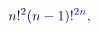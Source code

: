 \documentclass[12pt]{article}
\begin{document}
\makeatletter
\renewcommand*{\@textcolor}[3]{%
  \protect\leavevmode
  \begingroup
    \color#1{#2}#3%
  \endgroup
}
\makeatother
\begin{displaymath}
\mathcolor[RGB]{0,0,15}{n} \mathcolor[RGB]{0,0,30}{!} ^ { \mathcolor[RGB]{0,0,45}{2} } \mathcolor[RGB]{0,0,60}{(} \mathcolor[RGB]{0,0,75}{n} \mathcolor[RGB]{0,0,90}{-} \mathcolor[RGB]{0,0,105}{1} \mathcolor[RGB]{0,0,120}{)} \mathcolor[RGB]{0,0,135}{!} ^ { \mathcolor[RGB]{0,0,150}{2} \mathcolor[RGB]{0,0,165}{n} } \mathcolor[RGB]{0,0,180}{,}
\end{displaymath}
\end{document}
